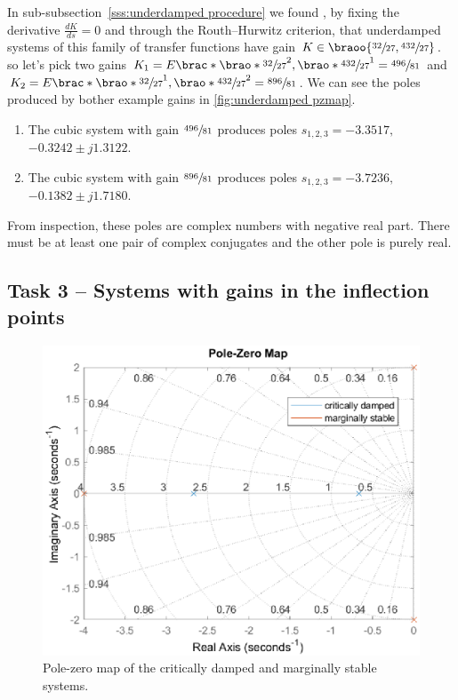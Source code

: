 \documentclass[12pt]{article}
\DeclarePairedDelimiter\brao()%
\DeclarePairedDelimiter\brac[]%
\begin{document}
In sub-subsection~\ref{sss:underdamped procedure} we found%
, by fixing the derivative $\frac{dK}{ds} = 0$ and through the Routh--Hurwitz criterion,
that underdamped systems of this family of transfer functions have gain $K \in \braoo{\sfrac{32}{27}, \sfrac{432}{27}}$.
so let's pick two gains $K_1 = E\brac*{\brao*{\sfrac{32}{27}}^2, \brao*{\sfrac{432}{27}}^1} = \sfrac{496}{81}$ and $K_2 = E\brac*{\brao*{\sfrac{32}{27}}^1, \brao*{\sfrac{432}{27}}^2} = \sfrac{896}{81}$.
We can see the poles produced by bother example gains in \ref{fig:underdamped pzmap}.

\begin{enumerate}
    \item 
        The cubic system with gain $\sfrac{496}{81}$ produces poles $s_{1,2,3} = -3.3517,$ $-0.3242 \pm j1.3122$.
    \item
        The cubic system with gain $\sfrac{896}{81}$ produces poles $s_{1,2,3} = -3.7236,$ $-0.1382 \pm j1.7180$.
\end{enumerate}

From inspection, these poles are complex numbers with negative real part. There must be at least one pair of complex conjugates and the other pole is purely real.

\subsection{Task 3 -- Systems with gains in the inflection points}

\begin{figure}
    \centering
    \includegraphics[width=\linewidth]{img/task02_03_04_inflection_pzmap.eps}
    \caption{Pole-zero map of the critically damped and marginally stable systems.}
    \label{fig:inflection points pzmap}
\end{figure}
\end{document}

